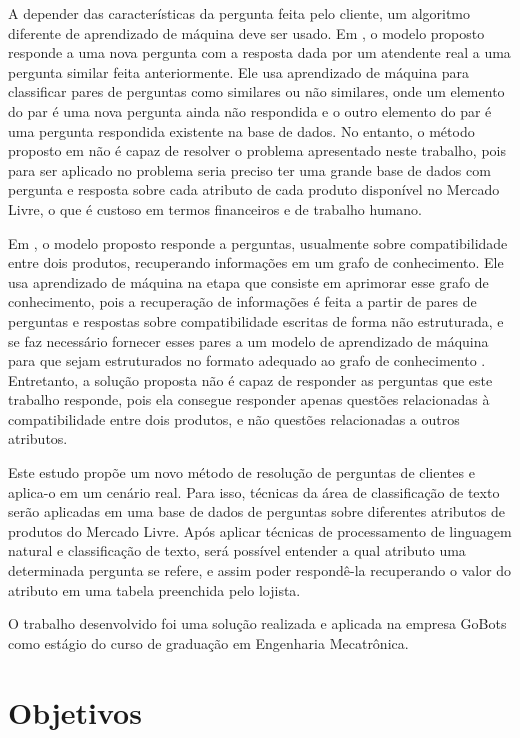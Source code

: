 A depender das características da pergunta feita pelo cliente, um algoritmo diferente de aprendizado de máquina deve ser usado. Em \cite{df}, o modelo proposto responde a uma nova pergunta com a resposta dada por um atendente real a uma pergunta similar feita anteriormente. Ele usa aprendizado de máquina para classificar pares de perguntas como similares ou não similares, onde um elemento do par é uma nova pergunta ainda não respondida e o outro elemento do par é uma pergunta respondida existente na base de dados. No entanto, o método proposto em \cite{df} não é capaz de resolver o problema apresentado neste trabalho, pois para ser aplicado no problema seria preciso ter uma grande base de dados com pergunta e resposta sobre cada atributo de cada produto disponível no Mercado Livre, o que é custoso em termos financeiros e de trabalho humano. 

Em \cite{kg}, o modelo proposto responde a perguntas, usualmente sobre compatibilidade entre dois produtos, recuperando informações em um grafo de conhecimento. Ele usa aprendizado de máquina na etapa que consiste em aprimorar esse grafo de conhecimento, pois a recuperação de informações é feita a partir de pares de perguntas e respostas sobre compatibilidade escritas de forma não estruturada, e se faz necessário fornecer esses pares a um modelo de aprendizado de máquina para que sejam estruturados no formato adequado ao grafo de conhecimento \cite{kg}. Entretanto, a solução proposta não é capaz de responder as perguntas que este trabalho responde, pois ela consegue responder apenas questões relacionadas à compatibilidade entre dois produtos, e não questões relacionadas a outros atributos.

Este estudo propõe um novo método de resolução de perguntas de clientes e aplica-o em um cenário real. Para isso, técnicas da área de classificação de texto serão aplicadas em uma base de dados de perguntas sobre diferentes atributos de produtos do Mercado Livre. Após aplicar técnicas de processamento de linguagem natural e classificação de texto, será possível entender a qual atributo uma determinada pergunta se refere, e assim poder respondê-la recuperando o valor do atributo em uma tabela preenchida pelo lojista.

O trabalho desenvolvido foi uma solução realizada e aplicada na empresa GoBots como estágio do curso de graduação em Engenharia Mecatrônica.

\section{Objetivos}
